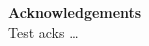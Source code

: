 \thispagestyle{empty}
\begin{titlepage}
{\bf\Large Acknowledgements}\\

Test acks \ldots

\vfill
\end{titlepage}
